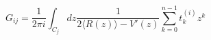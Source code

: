 \begin{equation}
G_{ij}=\frac{1}{2\pi i}\int_{C_j} dz \frac{1}
{2 \langle R(z)\rangle -V'(z)}\sum_{k=0}^{n-1}t^{(i)}_k z^k
\label{gij}
\end{equation}

